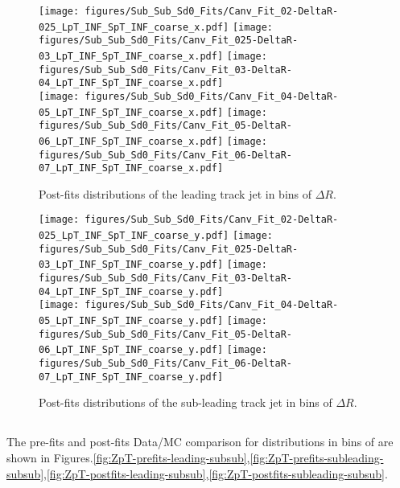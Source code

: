 \begin{figure}[htbp]
  \centering
 \texttt{[image: figures/Sub\_Sub\_Sd0\_Fits/Canv\_Fit\_02-DeltaR-025\_LpT\_INF\_SpT\_INF\_coarse\_x.pdf]}
 \texttt{[image: figures/Sub\_Sub\_Sd0\_Fits/Canv\_Fit\_025-DeltaR-03\_LpT\_INF\_SpT\_INF\_coarse\_x.pdf]}
 \texttt{[image: figures/Sub\_Sub\_Sd0\_Fits/Canv\_Fit\_03-DeltaR-04\_LpT\_INF\_SpT\_INF\_coarse\_x.pdf]}\\
 \texttt{[image: figures/Sub\_Sub\_Sd0\_Fits/Canv\_Fit\_04-DeltaR-05\_LpT\_INF\_SpT\_INF\_coarse\_x.pdf]}
 \texttt{[image: figures/Sub\_Sub\_Sd0\_Fits/Canv\_Fit\_05-DeltaR-06\_LpT\_INF\_SpT\_INF\_coarse\_x.pdf]}
 \texttt{[image: figures/Sub\_Sub\_Sd0\_Fits/Canv\_Fit\_06-DeltaR-07\_LpT\_INF\_SpT\_INF\_coarse\_x.pdf]}\\


\caption{Post-fits \subsubsdzero distributions of the leading track jet in bins of $\Delta R$. }
  \label{fig:dR-postfits-leading-subsub}
\end{figure}


\begin{figure}[htbp]
  \centering
 \texttt{[image: figures/Sub\_Sub\_Sd0\_Fits/Canv\_Fit\_02-DeltaR-025\_LpT\_INF\_SpT\_INF\_coarse\_y.pdf]}
 \texttt{[image: figures/Sub\_Sub\_Sd0\_Fits/Canv\_Fit\_025-DeltaR-03\_LpT\_INF\_SpT\_INF\_coarse\_y.pdf]}
 \texttt{[image: figures/Sub\_Sub\_Sd0\_Fits/Canv\_Fit\_03-DeltaR-04\_LpT\_INF\_SpT\_INF\_coarse\_y.pdf]}\\
 \texttt{[image: figures/Sub\_Sub\_Sd0\_Fits/Canv\_Fit\_04-DeltaR-05\_LpT\_INF\_SpT\_INF\_coarse\_y.pdf]}
 \texttt{[image: figures/Sub\_Sub\_Sd0\_Fits/Canv\_Fit\_05-DeltaR-06\_LpT\_INF\_SpT\_INF\_coarse\_y.pdf]}
 \texttt{[image: figures/Sub\_Sub\_Sd0\_Fits/Canv\_Fit\_06-DeltaR-07\_LpT\_INF\_SpT\_INF\_coarse\_y.pdf]}\\

\caption{Post-fits \subsubsdzero distributions of the sub-leading track jet in bins of $\Delta R$. }
  \label{fig:dR-postfits-subleading-subsub}
\end{figure}


\clearpage
\subsection{\zpt}

The pre-fits and post-fits Data/MC comparison for \subsubsdzero distributions in bins of \zpt are shown in Figures.\ref{fig:ZpT-prefits-leading-subsub},\ref{fig:ZpT-prefits-subleading-subsub},\ref{fig:ZpT-postfits-leading-subsub},\ref{fig:ZpT-postfits-subleading-subsub}.

